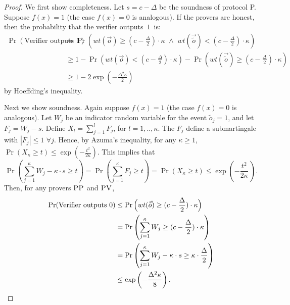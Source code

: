 \documentclass[11pt,letter]{article}
\theoremstyle{remark}
\theoremstyle{definition}
\newcommand{\pv}{\textsc{PV}}
\newcommand{\pp}{\textsc{PP}}
\begin{document}
\begin{proof} We first show completeness. 
Let $s = c- \Delta$ be the soundness of protocol P.
Suppose $f(x) = 1$ (the case $f(x) = 0$ is analogous). If the provers are honest, then the probability that the verifier outputs~$1$~is:
\begin{align*}
\Pr(\mbox{Verifier outputs $1$}) &= \Pr \left(wt(\vec{o}) \geq \left(c - \frac{\Delta}{2}\right)\cdot \kappa \,\, \land \,\, wt(\vec{\tilde{o}}) < \left(c - \frac{\Delta}{2}\right)\cdot \kappa \right)\\
&\geq 1-\Pr \left(wt(\vec{o}) < \left(c - \frac{\Delta}{2}\right)\cdot \kappa \right) - \Pr \left(wt(\vec{\tilde{o}}) \geq \left(c - \frac{\Delta}{2}\right)\cdot \kappa \right) \\
&\geq 1 - 2\exp \left(-\frac{\Delta^2\kappa}{2}\right)
\end{align*}
by Hoeffding's inequality.

Next we show soundness.
Again suppose $f(x) = 1$ (the case $f(x) = 0$ is analogous). Let $W_j$ be an indicator random variable for the event $\tilde{o}_j = 1$, and let $F_j = W_j - s$. Define $X_l = \sum_{j=1}^l F_j$, for $l=1,..,\kappa$. The $F_j$ define a submartingale with $|F_j| \leq 1 \,\, \forall j$. Hence, by Azuma's inequality, for any $\kappa\geq 1$, $\Pr(X_\kappa \geq t) \leq \exp(-\frac{t^2}{2\kappa})$. This implies that 
\begin{equation*}
\Pr \left(\sum_{j=1}^{\kappa} W_j - \kappa \cdot s \geq t \right) = \Pr \left(\sum_{j=1}^{\kappa}F_j \geq t \right) = \Pr \left(X_{\kappa} \geq t \right) \leq \exp\left(-\frac{t^2}{2\kappa}\, \right).
\end{equation*}
Then, for any provers $\pp$ and $\pv$,
\begin{align*}
\Pr(\mbox{Verifier outputs $0$}) &\leq \Pr \Big(wt(\vec{\tilde{o}}) \geq (c - \frac{\Delta}{2})\cdot \kappa \Big) \\
&= \Pr \left(\sum_{j=1}^\kappa W_j \geq (c - \frac{\Delta}{2})\cdot \kappa \right) \\
&= \Pr \left(\sum_{j=1}^{\kappa} W_j - \kappa \cdot s \geq \kappa \cdot \frac{\Delta}{2} \right) \\
&\leq \exp \left(-\frac{\Delta^2\kappa}{8}\right). \qedhere
\end{align*}
\end{proof}


\appendix


\end{document}
